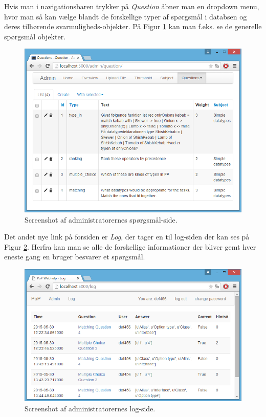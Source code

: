 \documentclass[11pt, a4paper]{article}
\begin{document}
Hvis man i navigationsbaren trykker på \emph{Question} åbner man en dropdown menu, hvor man så kan vælge blandt de forskellige typer af spørgsmål i databsen og deres tilhørende svarmuligheds-objekter. På Figur \ref{fig:screenshot_admin_question} kan man f.eks. se de generelle spørgsmål objekter.

\begin{figure}[htpb]
    \centering
    \includegraphics[width=1\linewidth]{figures/interface/admin_question.png}
    \caption{Screenshot af administratorernes spørgsmål-side.}
    \label{fig:screenshot_admin_question}
\end{figure}

Det andet nye link på forsiden er \emph{Log}, der tager en til log-siden der kan ses på Figur \ref{fig:screenshot_admin_log}. Herfra kan man se alle de forskellige informationer der bliver gemt hver eneste gang en bruger besvarer et spørgsmål.

\begin{figure}[htpb]
    \centering
    \includegraphics[width=1\linewidth]{figures/interface/admin_log.png}
    \caption{Screenshot af administratorernes log-side.}
    \label{fig:screenshot_admin_log}
\end{figure}
\end{document}
